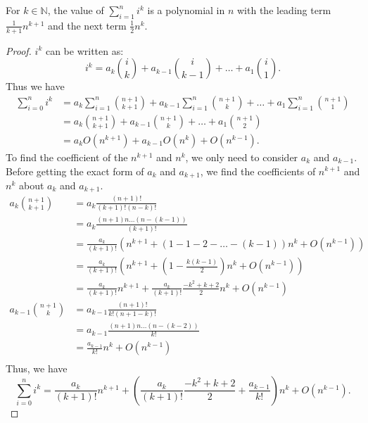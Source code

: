\documentclass[../main.tex]{subfiles}
\begin{document}
\begin{thm}
    For $k \in \mathbb N$, the value of $\sum_{i=1}^n i^k$ is a polynomial in $n$ with the leading term $\frac{1}{k+1} n^{k+1}$ and the next term $\frac 12 n^k$.
\end{thm}
\begin{proof}
    $i^k$ can be written as:
    \[
        i^k = a_k {i \choose k} + a_{k-1} {i \choose k - 1} + \dots + a_1 {i \choose 1}.
    \]
    Thus we have
    \begin{align*}
        \sum_{i=0}^n i^k &= a_k \sum_{i=1}^n {n + 1 \choose k + 1} + a_{k - 1} \sum_{i=1}^n {n + 1 \choose k} + \dots + a_1 \sum_{i=1}^n {n + 1 \choose 1}\\
                         &= a_k {n + 1 \choose k + 1} + a_{k-1} {n + 1 \choose k} + \dots + a_1 {n +  1 \choose 2}\\
                         &= a_k O(n^{k+1}) + a_{k-1} O(n^k) + O(n^{k-1}).
    \end{align*}
    To find the coefficient of the $n^{k+1}$ and $n^k$, we only need to consider $a_k$ and $a_{k-1}$.
    Before getting the exact form of $a_k$ and $a_{k+1}$, we find the coefficients of $n^{k+1}$ and $n^k$ about $a_k$ and $a_{k+1}$.
    \begin{align*}
        a_k {n + 1 \choose k + 1} &= a_k \frac{(n + 1)!}{(k + 1)! (n - k)!}\\
                                  &= a_k \frac{(n + 1) n \dots (n - (k - 1))}{(k + 1)!}\\
                                  &= \frac{a_k}{(k + 1)!} \left(n^{k + 1} + (1 - 1 - 2 - \dots - (k-1)) n^k + O(n^{k - 1})\right)\\
                                  &= \frac{a_k}{(k + 1)!} \left(n^{k + 1} + \left(1 - \frac{k(k-1)}{2}\right) n^k + O(n^{k - 1})\right)\\
                                  &= \frac{a_k}{(k + 1)!} n^{k + 1} + \frac{a_k}{(k+1)!}\frac{-k^2 + k + 2}{2} n^k + O(n^{k-1})\\
    a_{k-1} {n + 1 \choose k} &= a_{k - 1} \frac{(n + 1)!}{k! (n + 1 - k)!}\\
                              &= a_{k-1} \frac{(n+1)n \dots (n - (k-2))}{k!}\\
                              &= \frac{a_{k-1}}{k!} n^k + O(n^{k-1})\\
    \end{align*}
    Thus, we have
    \[
        \sum_{i = 0}^n i^k = \frac{a_k}{(k + 1)!} n^{k + 1} + \left( \frac{a_k}{(k + 1)!} \frac{- k^2 + k + 2}{2} + \frac{a_{k-1}}{k!}\right) n^k + O(n^{k-1}).
    \]


\end{proof}
\end{document}
